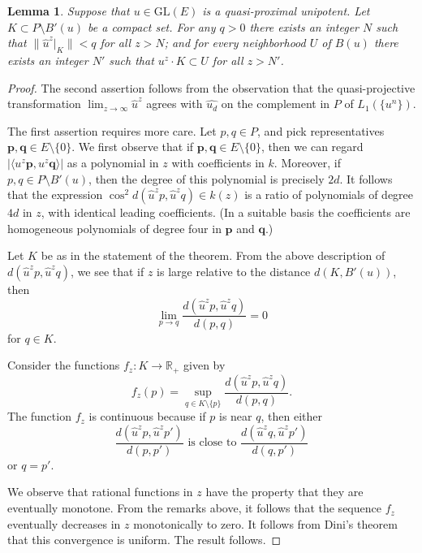 \documentclass{amsart}
\theoremstyle{plain}
\newtheorem{lemma}[theorem]{Lemma}
\theoremstyle{definition}
\theoremstyle{remark}
\newcommand{\Vect}[1]{\mathbold{#1}}
\providecommand{\abs}[1]{\lvert#1\rvert}
\providecommand{\norm}[1]{\lVert#1\rVert}
\begin{document}
\begin{lemma}\label{lem:quasiprox}
Suppose that $u \in \mathrm{GL}(E)$ is a quasi-proximal unipotent. Let $K \subset P
\setminus B'(u)$
be a compact set. For any $q > 0$ there exists an integer $N$ such that $\norm{
\widehat{u}^{z}|_{K}} < q$ for all $z > N$; and for every neighborhood $U$ of $B(u)$
there exists an integer $N'$ such that $u^{z}\cdot K \subset U$ for all $z > N'$.
\end{lemma}
\begin{proof}
The second assertion follows from the observation that the quasi-projective
transformation
$\lim_{z \to \infty}\widehat{u}^{z}$ agrees with $\widehat{u_{d}}$
on the complement in $P$ of $L_{1}(\{u^{n}\})$.

The first assertion requires more care. Let $p, q \in P$, and pick representatives $\Vect{p},
\Vect{q} \in E \setminus \{0\}$. We first observe
that if $\Vect{p}, \Vect{q} 
\in E \setminus \{0\}$, then we can regard
$\abs{\langle u^{z} \Vect{p}, u^{z} \Vect{q}\rangle}$ as a polynomial in $z$
with coefficients in $k$. Moreover, if $p, q \in P\setminus B'(u)$, then the degree of
this polynomial is precisely $2d$. It follows that the expression
$\cos^{2} d(\widehat{u}^{z}p, \widehat{u}^{z}q) \in k(z)$ is a ratio of polynomials
of degree $4d$ in $z$, with identical leading coefficients. (In a suitable basis the
coefficients
are homogeneous polynomials of degree four in $\Vect{p}$ and $\Vect{q}$.)

Let $K$ be as in the statement of the theorem. From the above description of $d(\widehat{u}^{z}p,
\widehat{u}^{z}q)$, we see that if $z$ is large relative to the distance $d(K, B'(u))$, 
then
$$\lim_{p \to q} \frac{d(\widehat{u}^{z}p, \widehat{u}^{z}q)}{d(p, q)} = 0$$
for $q \in K$.

Consider the functions $f_{z}: K \to \mathbb{R}_{+}$ given by
$$f_{z}(p) = \sup_{q \in K\setminus \{p\}}
\frac{d(\widehat{u}^{z}p, \widehat{u}^{z}q)}{d(p,q)}.$$
The function $f_{z}$ is continuous because if $p$ is near $q$, then either
$$\frac{d(\widehat{u}^{z}p, \widehat{u}^{z}p')}{d(p, p')}\text{ is close to }
\frac{d(\widehat{u}^{z}q, \widehat{u}^{z}p')}{d(q, p')}$$
or $q = p'$.

We observe that rational functions in $z$ have the property that they are eventually
monotone. From the remarks above, it follows that the sequence $f_{z}$
eventually decreases in $z$ monotonically 
to zero. It follows from Dini's theorem that this convergence is uniform. The result follows.
\end{proof}
\end{document}
